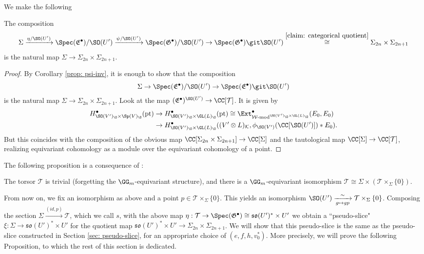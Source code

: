\documentclass[11pt]{article}
\begin{document}
We make the following
\begin{proposition}
    The composition
    $$\Sigma\xrightarrow{\eta/\SO(U')} \Spec(\mathfrak{E}^\bullet)/\SO(U')\xrightarrow{\psi/\SO(U')} \Spec(\mathfrak{G}^\bullet)/\SO(U')\to \Spec(\mathfrak{G}^\bullet)\git\SO(U')\stackrel{\ref{claim: categorical quotient}}{\cong}\Sigma_{2n}\times \Sigma_{2n+1}$$ is the natural map $\Sigma\to \Sigma_{2n}\times \Sigma_{2n+1}$.
\end{proposition}
\begin{proof}
    By Corollary \ref{prop: psi-inv}, it is enough to show that the composition
    $$\Sigma\to \Spec(\mathfrak{E}^\bullet)/\SO(U')\to \Spec(\mathfrak{E}^\bullet)\git\SO(U')$$
    is the natural map $\Sigma\to \Sigma_{2n}\times \Sigma_{2n+1}$.
    Look at the map $(\mathfrak{E}^\bullet)^{\SO(U')}\to \CC[\mathcal{T}]$. It is given by
    $$\begin{aligned}
        H^\bullet_{\SO(V')_\O\times \Sp(V)_\O}(\mathrm{pt})&\to H^\bullet_{\SO(V')_\O\times \GL(L)_\O}(\mathrm{pt})\cong \Ext^\bullet_{\operatorname{\mathcal{W}-\mathrm{mod}}^{\SO(V')_\O\times \GL(L)_\O}}(E_0, E_0)\\
        &\to H^\bullet_{\SO(V')_\O\times \GL(L)_\O}((V'\otimes L)_\mathcal{K}, \phi_{\SO(V')}(\CC[\SO(U')])*E_0).
    \end{aligned}$$
    But this coincides with the composition of the obvious map $\CC[\Sigma_{2n}\times \Sigma_{2n+1}]\to \CC[\Sigma]$ and the tautological map $\CC[\Sigma]\to \CC[\mathcal{T}]$, realizing equivariant cohomology as a module over the equivariant cohomology of a point.
\end{proof}
The following proposition is a consequence of \cite[Theorem 1]{Wed}:
\begin{proposition}\label{prop: torsor triviality}
    The torsor $\mathcal{T}$ is trivial (forgetting the $\GG_m$-equivariant structure), and there is a $\GG_m$-equivariant isomorphism $\mathcal{T}\cong \Sigma\times (\mathcal{T}\times_{\Sigma} \{0\})$.
\end{proposition}
From now on, we fix an isomorphism as above and a point $p\in\mathcal{T}\times_{\Sigma} \{0\}$. This yields an isomorphism $\SO(U')\xrightarrow[g\mapsto gp]{\sim}\mathcal{T}\times_{\Sigma} \{0\}$.
Composing the section $\Sigma\xrightarrow{(id,p)} \mathcal{T}$, which we call $s$, with the above map $\eta:\mathcal{T}\to \Spec(\mathfrak{G}^\bullet)\cong \mathfrak{so}(U')^*\times U'$ we obtain a ``pseudo-slice" $\xi: \Sigma\to \mathfrak{so}(U')^*\times U'$ for the quotient map $\mathfrak{so}(U')^*\times U'\to \Sigma_{2n}\times \Sigma_{2n+1}$. We will show that this pseudo-slice is the same as the pseudo-slice constructed in Section \ref{sec: pseudo-slice}, for an appropriate choice of $(e,f,h,v_0^*)$.
More precisely, we will prove the following Proposition, to which the rest of this section is dedicated.
\end{document}
